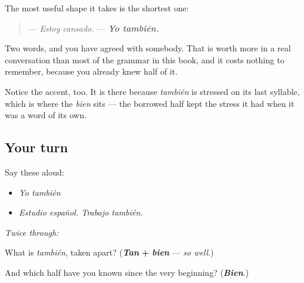\begin{culture}
The most useful shape it takes is the shortest one:

\begin{quote}
— \emph{Estoy cansado.} — \emph{\textbf{Yo también.}}
\end{quote}

Two words, and you have agreed with somebody. That is worth more in a real conversation than most of the grammar in this book, and it costs nothing to remember, because you already knew half of it.

Notice the accent, too. It is there because \emph{también} is stressed on its last syllable, which is where the \emph{bien} sits — the borrowed half kept the stress it had when it was a word of its own.
\end{culture}

\subsection*{Your turn}
Say these aloud:

\begin{itemize}
\raggedright
  \item \emph{Yo también}
  \item \emph{Estudio español. Trabajo también.}
\end{itemize}

\emph{Twice through:}

\begin{tcolorbox}[breakable,colback=teal!4,colframe=teal!35!black,title={Before you move on}]
What is \emph{también}, taken apart? (\emph{\textbf{Tan}} \textbf{+} \emph{\textbf{bien}} — \emph{so well}.)

And which half have you known since the very beginning? (\emph{\textbf{Bien}}.)
\end{tcolorbox}
